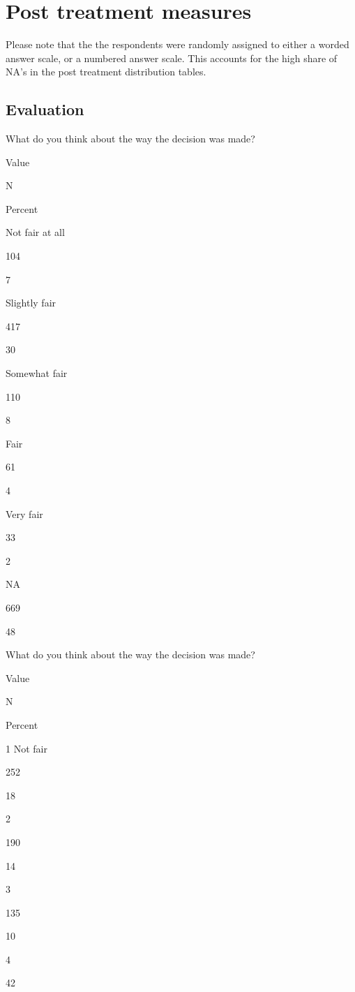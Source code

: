 \documentclass[
]{book}
\begin{document}
\hypertarget{post-treatment-measures-1}{%
\section{Post treatment measures}\label{post-treatment-measures-1}}

Please note that the the respondents were randomly assigned to either a
worded answer scale, or a numbered answer scale. This accounts for the
high share of NA's in the post treatment distribution tables.

\hypertarget{evaluation}{%
\subsection{Evaluation}\label{evaluation}}

What do you think about the way the decision was made?

Value

N

Percent

Not fair at all

104

7

Slightly fair

417

30

Somewhat fair

110

8

Fair

61

4

Very fair

33

2

NA

669

48

What do you think about the way the decision was made?

Value

N

Percent

1 Not fair

252

18

2

190

14

3

135

10

4

42
\end{document}
